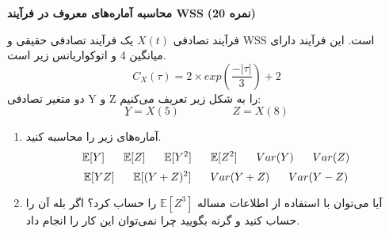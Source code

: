 \Large \textbf{محاسبه آماره‌های معروف در فرآیند WSS}
\large \textbf{(20 نمره)}

\normalsize \vspace{0.5cm}
فرآیند تصادفی
$ X(t) $
یک فرآیند تصادفی حقیقی و WSS است. این فرآیند دارای میانگین 4 و اتوکواریانس زیر است.
$$
C_X(\tau) = 2 \times exp(\frac{-|\tau|}{3}) + 2
$$
دو متغیر تصادفی Y و Z را به شکل زیر تعریف می‌کنیم:
$$
ِY = X(5)  \hspace{2cm} Z = X(8)
$$
\begin{enumerate}[label=(\alph*)]
	\item
	آماره‌های زیر را محاسبه کنید.
	$$
	\mathbb{E}[Y] 
	\hspace{0.6cm} 
	\mathbb{E}[Z] 
	\hspace{0.6cm}
	\mathbb{E}[Y^2] 
	\hspace{0.6cm} 
	\mathbb{E}[Z^2] 
	\hspace{0.6cm}
	Var(Y)
	\hspace{0.6cm} 
	Var(Z)
	$$
	$$
	\mathbb{E}[YZ] 
	\hspace{0.6cm} 
	\mathbb{E}[(Y+Z)^2] 
	\hspace{0.6cm}
	Var(Y + Z)
	\hspace{0.6cm}
	Var(Y - Z)
	$$
	\item 
	آیا می‌توان با استفاده از اطلاعات مساله
	$ \mathbb{E}[Z^3] $
	را حساب کرد؟ اگر بله آن را حساب کنید و گرنه بگویید چرا نمی‌توان این کار را انجام داد.
\end{enumerate}


